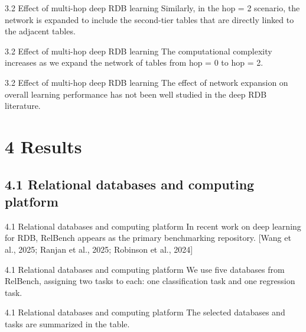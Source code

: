 \documentclass[aspectratio=169,10pt]{beamer}
\newcommand{\cit}[1]{{\scriptsize\color{gray}[#1]}}
\begin{document}
\begin{frame}{3.2 Effect of multi-hop deep RDB learning}
Similarly, in the hop = 2 scenario, the network is expanded to include the second-tier tables that are directly linked to the adjacent tables.
\end{frame}

\begin{frame}{3.2 Effect of multi-hop deep RDB learning}
The computational complexity increases as we expand the network of tables from hop = 0 to hop = 2.
\end{frame}

\begin{frame}{3.2 Effect of multi-hop deep RDB learning}
The effect of network expansion on overall learning performance has not been well studied in the deep RDB literature.
\end{frame}

\section{4 Results}
\subsection{4.1 Relational databases and computing platform}

\begin{frame}{4.1 Relational databases and computing platform}
In recent work on deep learning for RDB, RelBench appears as the primary benchmarking repository.
\cit{Wang et al., 2025; Ranjan et al., 2025; Robinson et al., 2024}
\end{frame}

\begin{frame}{4.1 Relational databases and computing platform}
We use five databases from RelBench, assigning two tasks to each: one classification task and one regression task.
\end{frame}

\begin{frame}{4.1 Relational databases and computing platform}
The selected databases and tasks are summarized in the table.
\end{frame}
\end{document}
